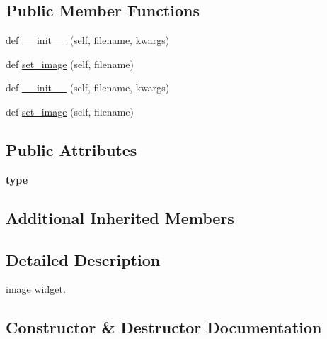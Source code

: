 \subsection*{Public Member Functions}
\begin{DoxyCompactItemize}
\item 
def \hyperlink{classremi_1_1gui_1_1Image_a85bf0e4d303e377ba8cf9e8b6100d4c1}{\+\_\+\+\_\+init\+\_\+\+\_\+} (self, filename, kwargs)
\item 
def \hyperlink{classremi_1_1gui_1_1Image_a222d376e090ea59cfbfe0b66e55d2fd4}{set\+\_\+image} (self, filename)
\item 
def \hyperlink{classremi_1_1gui_1_1Image_a85bf0e4d303e377ba8cf9e8b6100d4c1}{\+\_\+\+\_\+init\+\_\+\+\_\+} (self, filename, kwargs)
\item 
def \hyperlink{classremi_1_1gui_1_1Image_a222d376e090ea59cfbfe0b66e55d2fd4}{set\+\_\+image} (self, filename)
\end{DoxyCompactItemize}
\subsection*{Public Attributes}
\begin{DoxyCompactItemize}
\item 
{\bfseries type}\hypertarget{classremi_1_1gui_1_1Image_a55008fa6288d7bf8b33afd53b78bcb2f}{}\label{classremi_1_1gui_1_1Image_a55008fa6288d7bf8b33afd53b78bcb2f}

\end{DoxyCompactItemize}
\subsection*{Additional Inherited Members}


\subsection{Detailed Description}
\begin{DoxyVerb}image widget.\end{DoxyVerb}
 

\subsection{Constructor \& Destructor Documentation}
